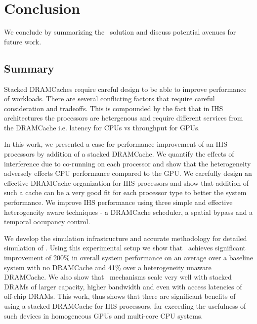 \chapter{Conclusion}
We conclude by summarizing the \cachename\ solution and discuss potential avenues for future work.
\section{Summary}
Stacked DRAMCaches require careful design to be able to improve performance of workloads. There are several conflicting factors that require careful consideration and tradeoffs. This is compounded by the fact that in IHS architectures the processors are hetergenous and require different services from the DRAMCache i.e. latency for CPUs vs throughput for GPUs.
\par In this work, we presented a case for performance improvement of an IHS processors by addition of a stacked DRAMCache. 
We quantify the effects of interference due to co-running on each processor and show that the heterogeneity adversely effects CPU performance compared to the GPU. 
We carefully design an effective DRAMCache organization for IHS processors and show that addition of such a cache can be a very good fit for each processor type to better the system performance.
We improve IHS performance using three simple and effective heterogeneity aware techniques - a DRAMCache scheduler, a spatial bypass and a temporal occupancy control. 
\par We develop the simulation infrastructure and accurate methodology for detailed simulation of \cachename. Using this experimental setup we show that 
\cachename\ achieves significant improvement of 200\% in overall system performance on an average over a baseline system with no DRAMCache and 41\% over a heterogeneity unaware DRAMCache. 
We also show that \cachename\ mechanisms scale very well with stacked DRAMs of larger capacity, higher bandwidth and even with access latencies of off-chip DRAMs.
This work, thus shows that there are significant benefits of using a stacked DRAMCache for IHS processors, far exceeding the usefulness of such devices in homogeneous GPUs and multi-core CPU systems.

